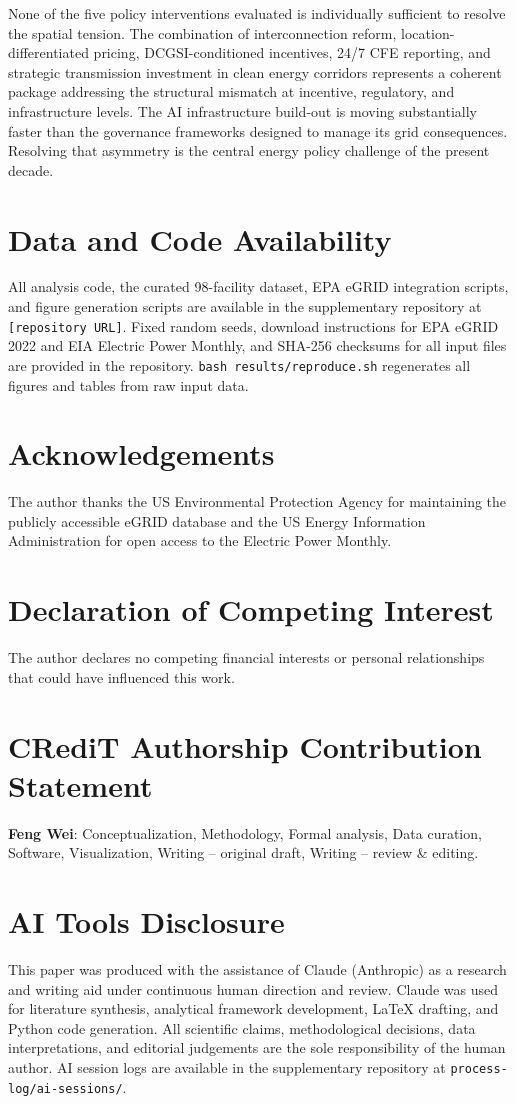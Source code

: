 \documentclass[preprint,12pt]{elsarticle}
\begin{document}
None of the five policy interventions evaluated is individually sufficient
to resolve the spatial tension. The combination of interconnection reform,
location-differentiated pricing, DCGSI-conditioned incentives, 24/7 CFE
reporting, and strategic transmission investment in clean energy corridors
represents a coherent package addressing the structural mismatch at
incentive, regulatory, and infrastructure levels. The AI infrastructure
build-out is moving substantially faster than the governance frameworks
designed to manage its grid consequences. Resolving that asymmetry is the
central energy policy challenge of the present decade.

\section*{Data and Code Availability}
All analysis code, the curated 98-facility dataset, EPA eGRID integration
scripts, and figure generation scripts are available in the supplementary
repository at \texttt{[repository URL]}. Fixed random seeds, download
instructions for EPA eGRID 2022 and EIA Electric Power Monthly, and
SHA-256 checksums for all input files are provided in the repository.
\texttt{bash results/reproduce.sh} regenerates all figures and tables
from raw input data.

\section*{Acknowledgements}
The author thanks the US Environmental Protection Agency for maintaining the
publicly accessible eGRID database and the US Energy Information Administration
for open access to the Electric Power Monthly.

\section*{Declaration of Competing Interest}
The author declares no competing financial interests or personal relationships
that could have influenced this work.

\section*{CRediT Authorship Contribution Statement}
\textbf{Feng Wei}: Conceptualization, Methodology, Formal analysis,
Data curation, Software, Visualization, Writing -- original draft,
Writing -- review \& editing.

\section*{AI Tools Disclosure}
This paper was produced with the assistance of Claude (Anthropic) as a
research and writing aid under continuous human direction and review.
Claude was used for literature synthesis, analytical framework development,
LaTeX drafting, and Python code generation. All scientific claims,
methodological decisions, data interpretations, and editorial judgements
are the sole responsibility of the human author. AI session logs are
available in the supplementary repository at
\texttt{process-log/ai-sessions/}.
\end{document}

